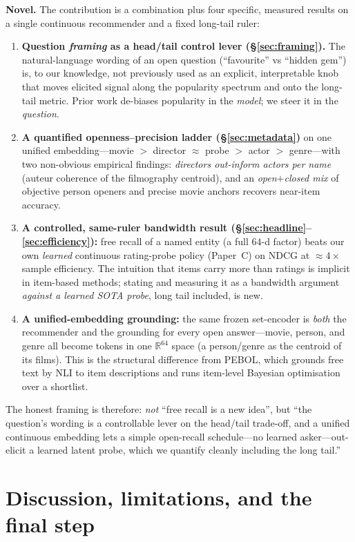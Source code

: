 \documentclass[11pt]{article}
\newcommand{\R}{\mathbb{R}}
\begin{document}
\textbf{Novel.} The contribution is a combination plus four specific, measured results on a single continuous
recommender and a fixed long-tail ruler:
\begin{enumerate}
  \item \textbf{Question \emph{framing} as a head/tail control lever (\S\ref{sec:framing}).} The natural-language wording
  of an open question (``favourite'' vs ``hidden gem'') is, to our knowledge, not previously used as an explicit,
  interpretable knob that moves elicited signal along the popularity spectrum and onto the long-tail metric. Prior work
  de-biases popularity in the \emph{model}; we steer it in the \emph{question}.
  \item \textbf{A quantified openness--precision ladder (\S\ref{sec:metadata})} on one unified embedding---movie $>$
  director $\approx$ probe $>$ actor $>$ genre---with two non-obvious empirical findings: \emph{directors out-inform
  actors per name} (auteur coherence of the filmography centroid), and an \emph{open$+$closed mix} of objective person
  openers and precise movie anchors recovers near-item accuracy.
  \item \textbf{A controlled, same-ruler bandwidth result (\S\ref{sec:headline}--\ref{sec:efficiency}):} free recall of
  a named entity (a full $64$-d factor) beats our own \emph{learned} continuous rating-probe policy (Paper~C) on NDCG at
  $\approx 4\times$ sample efficiency. The intuition that items carry more than ratings is implicit in item-based
  methods; stating and measuring it as a bandwidth argument \emph{against a learned SOTA probe}, long tail included, is
  new.
  \item \textbf{A unified-embedding grounding:} the same frozen set-encoder is \emph{both} the recommender and the
  grounding for every open answer---movie, person, and genre all become tokens in one $\R^{64}$ space (a person/genre as
  the centroid of its films). This is the structural difference from PEBOL, which grounds free text by NLI to item
  descriptions and runs item-level Bayesian optimisation over a shortlist.
\end{enumerate}
The honest framing is therefore: \emph{not} ``free recall is a new idea'', but ``the question's wording is a controllable
lever on the head/tail trade-off, and a unified continuous embedding lets a simple open-recall schedule---no learned
asker---out-elicit a learned latent probe, which we quantify cleanly including the long tail.''

\section{Discussion, limitations, and the final step}
\label{sec:future}
\end{document}

